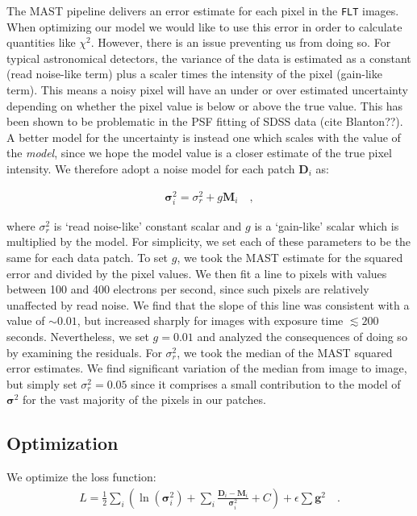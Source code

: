 \documentclass[12pt,letterpaper,preprint]{aastex}
\newcommand{\vect}[1]{\mathbf{#1}}
\newcommand{\FLT}{\texttt{FLT}\,\,}
\newcommand{\data}{\vect{D}}
\newcommand{\model}{\vect{M}}
\newcommand{\var}{\vect{\sigma}^2}
\newcommand{\gradients}{\vect{g}}
\begin{document}
The MAST pipeline delivers an error estimate for each pixel in the \FLT images.   When optimizing 
our model we would like to use this error in order to calculate quantities like $\chi^2$.  However, 
there is an issue preventing us from doing so.  For typical astronomical detectors, the variance of 
the data is estimated as a constant (read noise-like term) plus a scaler times the intensity of the pixel 
(gain-like term).  This means a noisy pixel will have an under or over estimated uncertainty depending 
on whether the pixel value is below or above the true value.  This has been shown to be 
problematic in the PSF fitting of SDSS data (cite Blanton??).  A better model for the uncertainty is 
instead one which scales with the value of the \emph{model}, since we hope the model value is a 
closer estimate of the true pixel intensity.  We therefore adopt a noise model for each patch $\data_i$
as:

\begin{eqnarray}
\var_i =  \sigma_{r}^2 + g \model_i
\quad , 
\label{eqn:model-noflat}
\end{eqnarray}

\noindent where $\sigma_{r}^2$ is `read noise-like' constant scalar and $g$ is a `gain-like' scalar 
which is multiplied by the model.  For simplicity, we set each of these parameters to be the same 
for each data patch.  To set $g$, we took the MAST estimate for the squared error and 
divided by the pixel values.  We then fit a line to pixels with values between 100 and 
400 electrons per second, since such pixels are relatively unaffected by read noise.  We find that 
the slope of this line was consistent with a value of 
$\sim0.01$, but increased sharply for images with exposure time $\lesssim 200$ seconds.  
Nevertheless, we set $g=0.01$ and analyzed the consequences of doing so by examining the 
residuals.  For $\sigma_{r}^2$, we took the median of the MAST squared error estimates.  We find 
significant variation of the median from image to image, but simply set $\sigma_{r}^2=0.05$ since 
it comprises a small contribution to the model of $\var$ for the vast majority of the pixels in our 
patches.

\subsection{Optimization}

We optimize the loss function:
\begin{eqnarray}
L =  \frac{1}{2}\sum_i\left(\ln(\var_i) + \sum_{i} \frac{\data_i - \model_i}{\var_i} + C\right) + 
\epsilon \sum \gradients^2 
\quad .
\label{eqn:model-noflat}
\end{eqnarray}
\end{document}

